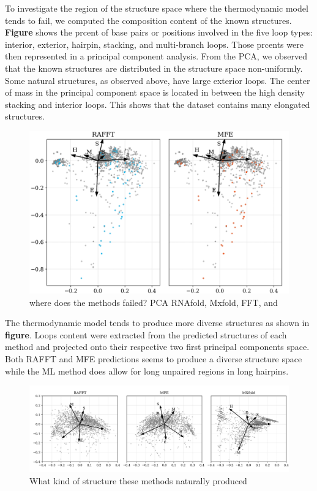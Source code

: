 \documentclass[a4paper,12pt]{article}
\begin{document}
{{To investigate the region of the structure space where the thermodynamic model
tends to fail, we computed the composition content of the known structures.
\textbf{Figure} shows the prcent of base pairs or positions involved in the five loop
types: interior, exterior, hairpin, stacking, and multi-branch loops. Those
prcents were then represented in a principal component analysis. From the PCA,
we observed that the known structures are distributed in the structure space
non-uniformly. Some natural structures, as observed above, have large exterior
loops. The center of mass in the principal component space is located in between
the high density stacking and interior loops. This shows that the dataset
contains many elongated structures.

\begin{figure}[htbp]
\centering
\includegraphics[width=.9\linewidth]{img/comp_fails.png}
\caption{where does the methods failed? PCA RNAfold, Mxfold, FFT, and}
\end{figure}

The thermodynamic model tends to produce more diverse structures as shown in
\textbf{figure}. Loops content were extracted from the predicted structures of each
method and projected onto their respective two first principal components space.
Both RAFFT and MFE predictions seems to produce a diverse structure space while
the ML method does allow for long unpaired regions in long hairpins.

\begin{figure}[htbp]
\centering
\includegraphics[width=.9\linewidth]{img/content_predicted_data.png}
\caption{What kind of structure these methods naturally produced}
\end{figure}

}}
\end{document}
